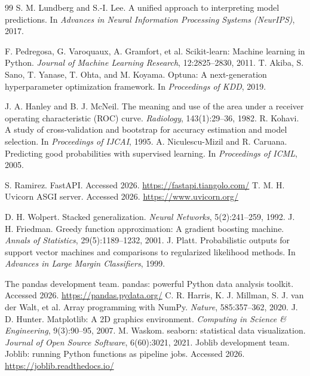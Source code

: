 \documentclass[12pt, a4paper, oneside]{book}
\begin{document}
\begin{thebibliography}{99}
 S. M. Lundberg and S.-I. Lee. A unified approach to interpreting model predictions. In \textit{Advances in Neural Information Processing Systems (NeurIPS)}, 2017.

 F. Pedregosa, G. Varoquaux, A. Gramfort, et al. Scikit-learn: Machine learning in Python. \textit{Journal of Machine Learning Research}, 12:2825--2830, 2011.
 T. Akiba, S. Sano, T. Yanase, T. Ohta, and M. Koyama. Optuna: A next-generation hyperparameter optimization framework. In \textit{Proceedings of KDD}, 2019.

 J. A. Hanley and B. J. McNeil. The meaning and use of the area under a receiver operating characteristic (ROC) curve. \textit{Radiology}, 143(1):29--36, 1982.
 R. Kohavi. A study of cross-validation and bootstrap for accuracy estimation and model selection. In \textit{Proceedings of IJCAI}, 1995.
 A. Niculescu-Mizil and R. Caruana. Predicting good probabilities with supervised learning. In \textit{Proceedings of ICML}, 2005.

 S. Ramirez. FastAPI. Accessed 2026. \url{https://fastapi.tiangolo.com/}
 T. M. H. Uvicorn ASGI server. Accessed 2026. \url{https://www.uvicorn.org/}

 D. H. Wolpert. Stacked generalization. \textit{Neural Networks}, 5(2):241--259, 1992.
 J. H. Friedman. Greedy function approximation: A gradient boosting machine. \textit{Annals of Statistics}, 29(5):1189--1232, 2001.
 J. Platt. Probabilistic outputs for support vector machines and comparisons to regularized likelihood methods. In \textit{Advances in Large Margin Classifiers}, 1999.

 The pandas development team. pandas: powerful Python data analysis toolkit. Accessed 2026. \url{https://pandas.pydata.org/}
 C. R. Harris, K. J. Millman, S. J. van der Walt, et al. Array programming with NumPy. \textit{Nature}, 585:357--362, 2020.
 J. D. Hunter. Matplotlib: A 2D graphics environment. \textit{Computing in Science \& Engineering}, 9(3):90--95, 2007.
 M. Waskom. seaborn: statistical data visualization. \textit{Journal of Open Source Software}, 6(60):3021, 2021.
 Joblib development team. Joblib: running Python functions as pipeline jobs. Accessed 2026. \url{https://joblib.readthedocs.io/}


\end{thebibliography}
\end{document}

